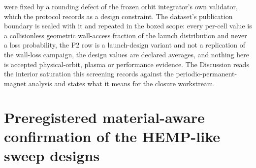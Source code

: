 \documentclass[11pt]{article}
\begin{document}
were fixed by a rounding defect of the frozen orbit integrator's own validator,
which the protocol records as a design constraint. The dataset's publication
boundary is sealed with it and repeated in the boxed scope: every per-cell value is
a collisionless geometric wall-access fraction of the launch distribution and never
a loss probability, the P2 row is a launch-design variant and not a replication of
the wall-loss campaign, the design values are declared averages, and nothing here is
accepted physical-orbit, plasma or performance evidence. The Discussion reads the
interior saturation this screening records against the periodic-permanent-magnet
analysis and states what it means for the closure workstream.



\section{Preregistered material-aware confirmation of the HEMP-like sweep designs}
\label{sec:l1b-hemp-confirmation}
\end{document}
